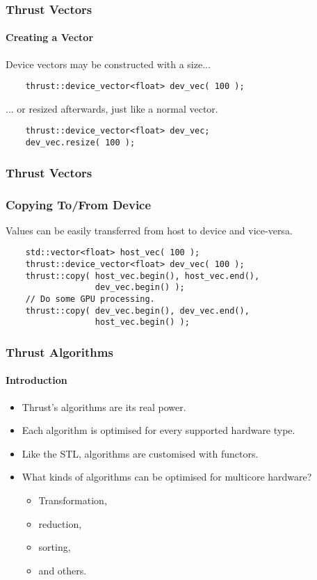 \begin{frame}[fragile]
  \frametitle{Thrust Vectors}
  \framesubtitle{Creating a Vector}
  Device vectors may be constructed with a size...
  \begin{example}
    \begin{lstlisting}
    thrust::device_vector<float> dev_vec( 100 );
    \end{lstlisting}
  \end{example}
  ... or resized afterwards, just like a normal vector.
  \begin{example}
    \begin{lstlisting}
    thrust::device_vector<float> dev_vec;
    dev_vec.resize( 100 );
    \end{lstlisting}
  \end{example}
\end{frame}

\begin{frame}[fragile]
  \frametitle{Thrust Vectors}
  \frametitle{Copying To/From Device}
  Values can be easily transferred from host to device and
  vice-versa.
  \begin{example}
    \begin{lstlisting}
    std::vector<float> host_vec( 100 );
    thrust::device_vector<float> dev_vec( 100 );
    thrust::copy( host_vec.begin(), host_vec.end(),
                  dev_vec.begin() );
    // Do some GPU processing.
    thrust::copy( dev_vec.begin(), dev_vec.end(),
                  host_vec.begin() );
    \end{lstlisting}
  \end{example}
\end{frame}

\begin{frame}
  \frametitle{Thrust Algorithms}
  \framesubtitle{Introduction}
  \begin{itemize}
  \item Thrust's algorithms are its real power.
  \pause
  \item Each algorithm is optimised for every supported hardware type.
  \pause
  \item Like the STL, algorithms are customised with functors.
  \pause
  \item What kinds of algorithms can be optimised for multicore hardware?
  \begin{itemize}
    \item Transformation,
    \item reduction,
    \item sorting,
    \item and others.
  \end{itemize}
  \end{itemize}
\end{frame}


